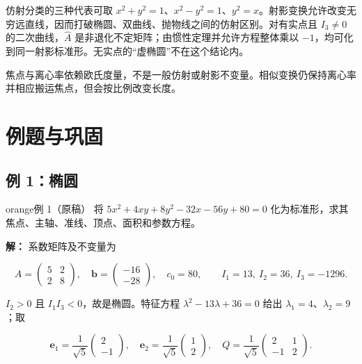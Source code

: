 \documentclass[11pt,a4paper]{article}
\begin{document}
仿射分类的三种代表可取
\(x^2+y^2=1\)、\(x^2-y^2=1\)、\(y^2=x\)。射影变换允许改变无穷远直线，因而打破椭圆、双曲线、抛物线之间的仿射区别。对有实点且
\(I_3\ne0\) 的二次曲线，\(\widehat A\)
是非退化不定矩阵；由惯性定理并允许方程整体乘以
\(-1\)，均可化到同一射影标准形。无实点的``虚椭圆''不在这个结论内。

焦点与离心率依赖欧氏度量，不是一般仿射或射影不变量。相似变换仍保持离心率并相应搬运焦点，但会按比例改变长度。

\section{例题与巩固}\label{ux4f8bux9898ux4e0eux5de9ux56fa}

\subsection{例 1：椭圆}\label{ux4f8b-1ux692dux5706}

\begin{sboxenv}{orange}{例 1（原稿）}
将 \(5x^2+4xy+8y^2-32x-56y+80=0\)
化为标准形，求其焦点、主轴、准线、顶点、面积和参数方程。

\end{sboxenv}

\textbf{解：} 系数矩阵及不变量为

\begin{equation*}
A=\begin{pmatrix}5&2\\2&8\end{pmatrix},\quad \boldsymbol b=\begin{pmatrix}-16\\-28\end{pmatrix},\quad c_0=80,\qquad I_1=13,\ I_2=36,\ I_3=-1296.
\end{equation*}

\(I_2>0\) 且 \(I_1I_3<0\)，故是椭圆。特征方程
\(\lambda^2-13\lambda+36=0\) 给出 \(\lambda_1=4\)、\(\lambda_2=9\)；取

\begin{equation*}
\boldsymbol e_1=\frac1{\sqrt5}\begin{pmatrix}2\\-1\end{pmatrix},\quad \boldsymbol e_2=\frac1{\sqrt5}\begin{pmatrix}1\\2\end{pmatrix},\quad Q=\frac1{\sqrt5}\begin{pmatrix}2&1\\-1&2\end{pmatrix}.
\end{equation*}
\end{document}
